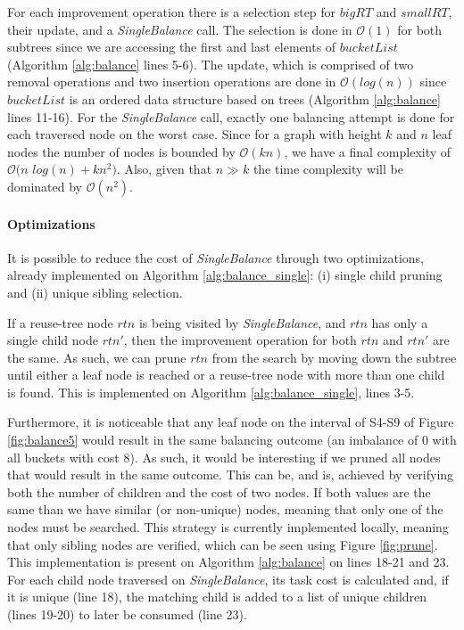 For each improvement operation there is a selection step for $bigRT$ and $smallRT$, their update, and a {\em SingleBalance} call. The selection is done in $\mathcal{O}(1)$ for both subtrees since we are accessing the first and last elements of $bucketList$ (Algorithm \ref{alg:balance} lines 5-6). The update, which is comprised of two removal operations and two insertion operations are done in $\mathcal{O}(log(n))$ since $bucketList$ is an ordered data structure based on trees (Algorithm \ref{alg:balance} lines 11-16). For the {\em SingleBalance} call, exactly one balancing attempt is done for each traversed node on the worst case. Since for a graph with height $k$ and $n$ leaf nodes the number of nodes is bounded by $\mathcal{O}(kn)$, we have a final complexity of $\mathcal{O}(n$ $log(n) + kn^2)$. Also, given that $n \gg k$ the time complexity will be dominated by $\mathcal{O}(n^2)$.


\paragraph{Optimizations}

It is possible to reduce the cost of {\em SingleBalance} through two optimizations, already implemented on Algorithm \ref{alg:balance_single}: (i) single child pruning and (ii) unique sibling selection.

If a reuse-tree node $rtn$ is being visited by {\em SingleBalance}, and $rtn$ has only a single child node $rtn'$, then the improvement operation for both $rtn$ and $rtn'$ are the same. As such, we can prune $rtn$ from the search by moving down the subtree until either a leaf node is reached or a reuse-tree node with more than one child is found. This is implemented on Algorithm \ref{alg:balance_single}, lines 3-5.

Furthermore, it is noticeable that any leaf node on the interval of S4-S9 of Figure \ref{fig:balance5} would result in the same balancing outcome (an imbalance of 0 with all buckets with cost 8). As such, it would be interesting if we pruned all nodes that would result in the same outcome. This can be, and is, achieved by verifying both the number of children and the cost of two nodes. If both values are the same than we have similar (or non-unique) nodes, meaning that only one of the nodes must be searched. This strategy is currently implemented locally, meaning that only sibling nodes are verified, which can be seen using Figure \ref{fig:prune}. This implementation is present on Algorithm \ref{alg:balance} on lines 18-21 and 23. For each child node traversed on {\em SingleBalance}, its task cost is calculated and, if it is unique (line 18), the matching child is added to a list of unique children (lines 19-20) to later be consumed (line 23).

